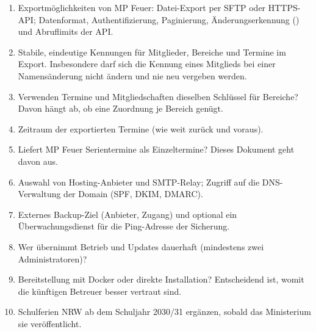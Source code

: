 \begin{enumerate}
  \item Exportmöglichkeiten von MP Feuer: Datei-Export per SFTP oder
        HTTPS-API; Datenformat, Authentifizierung, Paginierung,
        Änderungserkennung () und Abruflimits der API.
  \item Stabile, eindeutige Kennungen für Mitglieder, Bereiche und Termine
        im Export. Insbesondere darf sich die Kennung eines Mitglieds bei
        einer Namensänderung nicht ändern und nie neu vergeben werden.
  \item Verwenden Termine und Mitgliedschaften dieselben Schlüssel für
        Bereiche? Davon hängt ab, ob eine Zuordnung je Bereich genügt.
  \item Zeitraum der exportierten Termine (wie weit zurück und voraus).
  \item Liefert MP Feuer Serientermine als Einzeltermine? Dieses Dokument
        geht davon aus.
  \item Auswahl von Hosting-Anbieter und SMTP-Relay; Zugriff auf die
        DNS-Verwaltung der Domain (SPF, DKIM, DMARC).
  \item Externes Backup-Ziel (Anbieter, Zugang) und optional ein
        Überwachungsdienst für die Ping-Adresse der Sicherung.
  \item Wer übernimmt Betrieb und Updates dauerhaft (mindestens zwei
        Administratoren)?
  \item Bereitstellung mit Docker oder direkte Installation? Entscheidend
        ist, womit die künftigen Betreuer besser vertraut sind.
  \item Schulferien NRW ab dem Schuljahr 2030/31 ergänzen, sobald das
        Ministerium sie veröffentlicht.
\end{enumerate}

